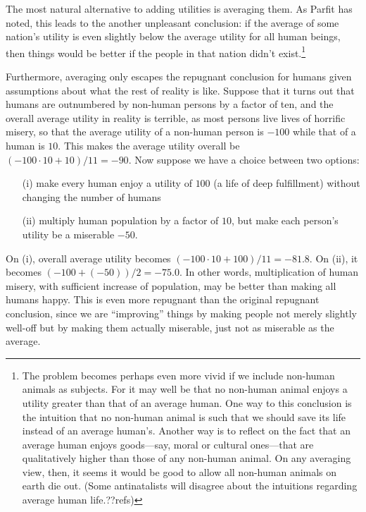 The most natural alternative to adding utilities is averaging them. As Parfit has noted, this leads to the another
unpleasant conclusion: if the average of some nation's utility is even slightly below the average utility for all
human beings, then things would be better if the people in that nation didn't exist.\footnote{The problem becomes
perhaps even more vivid if we include non-human animals as subjects. For it may well be that no non-human animal
enjoys a utility greater than that of an average human. One way to this conclusion is the intuition that no 
non-human animal is such that we should save its life instead of an average human's. Another way is to reflect on
the fact that an average human enjoys goods---say, moral or cultural ones---that are qualitatively higher than those
of any non-human animal. On any averaging view, then, it seems it would be good to allow all non-human animals on 
earth die out. (Some antinatalists will disagree about the intuitions regarding average human life.??refs)} 

Furthermore, averaging only escapes the repugnant conclusion for humans given assumptions about what the rest of reality 
is like. Suppose that it turns out that humans are outnumbered by non-human persons by a factor of ten, and the overall average
utility in reality is terrible, as most persons live lives of horrific misery, so that the average utility of a non-human 
person is $-100$ while that of a human is $10$. This makes the average utility overall be $(-100\cdot 10 + 10)/11 = -90$.
Now suppose we have a choice between two options:
\begin{enumerate}
\item[(i)] make every human enjoy a utility of $100$ (a life of deep fulfillment) without changing the number of humans
\item[(ii)]  multiply human population by a factor of $10$, but make each person's utility be a miserable $-50$. 
\end{enumerate}
On (i), overall average utility
becomes $(-100\cdot 10 + 100)/11 = -81.8$. On (ii), it becomes $(-100+(-50))/2 = -75.0$. In other words, multiplication 
of human misery, with sufficient increase of population, may be better than making all humans happy. This is even more repugnant than the original repugnant conclusion, since we are 
``improving'' things by making people not merely slightly well-off but by making them actually miserable, just not as miserable
as the average.

